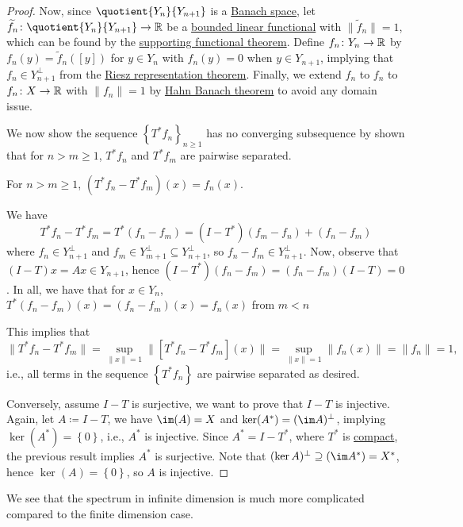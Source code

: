 \begin{proof}
	Now, since \(\quotient{Y_n}{Y_{n+1}} \) is a \hyperref[def:Banach-space]{Banach space}, let \(\widetilde{f} _n \colon \quotient{Y_n}{Y_{n+1}} \to  \mathbb{\MakeUppercase{r}} \) be a \hyperref[def:bounded-linear-functional]{bounded linear functional} with \(\lVert \widetilde{f} _n \rVert=1 \), which can be found by the \hyperref[thm:supporting-functional]{supporting functional theorem}. Define \(f_{n} \colon Y_n \to  \mathbb{\MakeUppercase{r}} \) by \(f_n (y) = \widetilde{f} _n([y])\) for \(y\in Y_n\) with \(f_n(y) = 0\) when \(y\in Y_{n+1}\), implying that \(f_n \in Y _{n+1}^{\perp}\) from the \hyperref[thm:Riesz-representation]{Riesz representation theorem}. Finally, we extend \(f_n\) to \(f_{n} \) to \(f_{n} \colon X\to \mathbb{\MakeUppercase{r}} \) with \(\lVert f_{n} \rVert = 1\) by \hyperref[thm:Hahn-Banach]{Hahn Banach theorem} to avoid any domain issue.

	We now show the sequence \(\left\{ T^{\ast} f_{n}  \right\} _{n\geq 1}\) has no converging subsequence by shown that for \(n > m \geq 1\), \(T^{\ast} f_n\) and \(T^{\ast} f_m\) are pairwise separated.

	\begin{claim}
		For \(n > m \geq 1\), \((T^{\ast} f_n - T^{\ast} f_m)(x) = f_n (x)\).
	\end{claim}
	\begin{explanation}
		We have
		\[
			T^{\ast} f_{n} - T^{\ast} f_m= T^{\ast} (f_{n} - f_{m}) = (I-T^{\ast} )(f_m-f_{n})+ (f_{n} -f_{m})
		\]
		where \(f_n\in Y^{\perp} _{n+1}\) and \(f_m\in Y^{\perp} _{m+1} \subseteq Y^{\perp} _{n+1}\), so \(f_n - f_m\in Y^{\perp} _{n+1}\). Now, observe that \((I-T)x = Ax\in Y_{n+1}\), hence \((I-T^{\ast} )(f_n - f_m) = (f_n - f_m)(I-T) = 0\). In all, we have that for \(x\in Y_n\), \(T^{\ast} (f_{n} - f_m)(x) = (f_n - f_m)(x)=f_n(x)\) from \(m < n\)
	\end{explanation}
	This implies that
	\[
		\lVert T^{\ast} f_n - T^{\ast} f_m \rVert
		= \sup _{\lVert x \rVert = 1} \lVert [T^{\ast} f_n - T^{\ast} f_m] (x)\rVert
		= \sup _{\lVert x \rVert = 1} \lVert f_n(x) \rVert
		= \lVert f_n \rVert
		= 1,
	\]
	i.e., all terms in the sequence \(\left\{ T^{\ast} f_n \right\} \) are pairwise separated as desired.

	Conversely, assume \(I-T\) is surjective, we want to prove that \(I-T\) is injective. Again, let \(A\coloneqq I-T\), we have \(\im(A) = X\) and \(\ker(A^{\ast} )= (\im A)^{\perp} \), implying \(\ker(A^{\ast} ) = \left\{ 0\right\} \), i.e., \(A^{\ast} \) is injective. Since \(A^{\ast} = I-T^{\ast} \), where \(T^{\ast} \) is \hyperref[def:compact-op]{compact}, the previous result implies \(A^{\ast} \) is surjective. Note that \((\ker A)^{\perp} \supseteq (\im A^{\ast} )= X^{\ast}\), hence \(\ker(A) = \left\{ 0 \right\} \), so \(A\) is injective.
\end{proof}

We see that the spectrum in infinite dimension is much more complicated compared to the finite dimension case.
